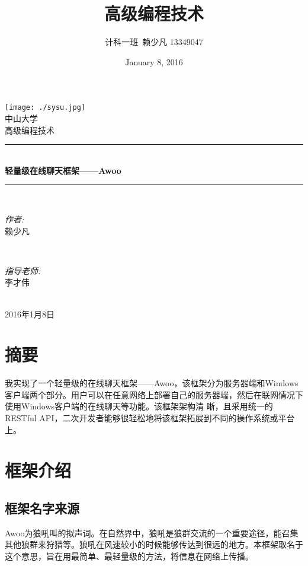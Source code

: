\documentclass[a4paper,11pt]{article}
\title{高级编程技术}
\author{计科一班~赖少凡 13349047}
\date{January 8, 2016}
\begin{document}
\begin{titlepage}
	\newcommand{\HRule}{\rule{\linewidth}{0.5mm}}
	\center
	
	\texttt{[image: ./sysu.jpg]}~\\[1cm]
	\textsc{\LARGE 中山大学}\\[1.5cm]
	\textsc{\Large 高级编程技术}\\[0.5cm]
	
	\HRule \\[0.8cm]
	{ \huge \bfseries 轻量级在线聊天框架——Awoo}\\[0.4cm]
	\HRule \\[1.5cm]
	
	\begin{minipage}{0.4\textwidth}
		\begin{flushleft} \large
			\emph{作者:}\\
			赖少凡
		\end{flushleft}
	\end{minipage}
	~
	\begin{minipage}{0.4\textwidth}
		\begin{flushright} \large
		\emph{指导老师:} \\
			李才伟
		\end{flushright}
	\end{minipage}\\[4cm]


	{\large 2016年1月8日}\\[3cm]

	\end{titlepage}



\section*{摘要}
    我实现了一个轻量级的在线聊天框架——Awoo，该框架分为服务器端和Windows客户端两个部分。用户可以在任意网络上部署自己的服务器端，然后在联网情况下使用Windows客户端的在线聊天等功能。该框架架构清
    晰，且采用统一的RESTful API，二次开发者能够很轻松地将该框架拓展到不同的操作系统或平台上。
\tableofcontents
\clearpage

\section{框架介绍}
    \subsection{框架名字来源}
        Awoo为狼吼叫的拟声词。在自然界中，狼吼是狼群交流的一个重要途径\textsuperscript{\cite{2}}，能召集其他狼群来狩猎等。狼吼在风速较小的时候能够传达到很远的地方\textsuperscript{\cite{2}}。本框架取名于这个意思，旨在用最简单、最轻量级的方法，将信息在网络上传播。
\end{document}
